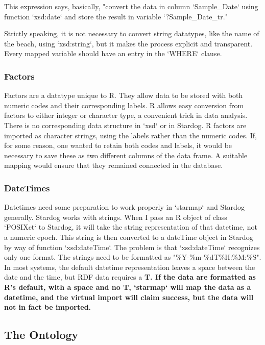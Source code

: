 \documentclass{article}\usepackage[]{graphicx}\usepackage[]{xcolor}
\begin{document}
This expression says, basically, "convert the data in column `Sample\_Date` using function `xsd:date` and store the result in variable `?Sample\_Date\_tr."

Strictly speaking, it is not necessary to convert string datatypes, like the name of the beach, using `xsd:string`, but it makes the process explicit and transparent. Every mapped variable should have an entry in the `WHERE` clause.

\subsubsection{Factors}

Factors are a datatype unique to R. They allow data to be stored with both numeric codes and their corresponding labels. R allows easy conversion from factors to either integer or character type, a convenient trick in data analysis. There is no corresponding data structure in `xsd` or in Stardog. R factors are imported as character strings, using the labels rather than the numeric codes. If, for some reason, one wanted to retain both codes and labels, it would be necessary to save these as two different columns of the data frame. A suitable mapping would ensure that they remained connected in the database.

\subsubsection{DateTimes}

Datetimes need some preparation to work properly in `starmap` and Stardog generally. Stardog works with strings. When I pass an R object of class `POSIXct` to Stardog, it will take the string representation of that datetime, not a numeric epoch. This string is then converted to a dateTime object in Stardog by way of function `xsd:dateTime`. The problem is that `xsd:dateTime` recognizes only one format. The strings need to be formatted as "\%Y-\%m-\%dT\%H:\%M:\%S". In most systems, the default datetime representation leaves a space between the date and the time, but RDF data requires a \bf{T}. If the data are formatted as R's default, with a space and no \bf{T}, `starmap` will map the data as a datetime, and the virtual import will claim success, but the data will not in fact be imported.

\subsection{The Ontology}
\end{document}
